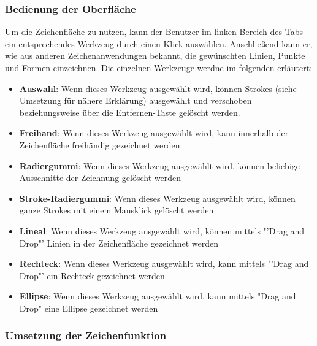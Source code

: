 \subsubsection{Bedienung der Oberfläche}

Um die Zeichenfläche zu nutzen, kann der Benutzer im linken Bereich des Tabs ein entsprechendes Werkzeug durch einen Klick auswählen. Anschließend kann er, wie aus anderen Zeichenanwendungen bekannt, die gewünschten Linien, Punkte und Formen einzeichnen. Die einzelnen Werkzeuge werdne im folgenden erläutert:
\begin{itemize}
\item \textbf{Auswahl}: Wenn dieses Werkzeug ausgewählt wird, können Strokes (siehe Umsetzung für nähere Erklärung) ausgewählt und verschoben beziehungsweise über die Entfernen-Taste gelöscht werden.
\item \textbf{Freihand}: Wenn dieses Werkzeug ausgewählt wird, kann innerhalb der Zeichenfläche freihändig gezeichnet werden
\item \textbf{Radiergummi}: Wenn dieses Werkzeug ausgewählt wird, können beliebige Ausschnitte der Zeichnung gelöscht werden
\item \textbf{Stroke-Radiergummi}: Wenn dieses Werkzeug ausgewählt wird, können ganze Strokes mit einem Mausklick gelöscht werden
\item \textbf{Lineal}: Wenn dieses Werkzeug ausgewählt wird, können mittels "'Drag and Drop"' Linien in der Zeichenfläche gezeichnet werden
\item \textbf{Rechteck}: Wenn dieses Werkzeug ausgewählt wird, kann mittels "'Drag and Drop"' ein Rechteck gezeichnet werden
\item \textbf{Ellipse}: Wenn dieses Werkzeug ausgewählt wird, kann mittels "Drag and Drop" eine Ellipse gezeichnet werden
\end{itemize}

\subsubsection{Umsetzung der Zeichenfunktion}

